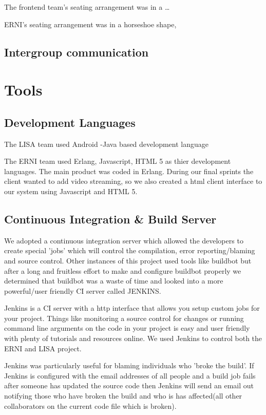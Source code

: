 \documentclass[11pt]{report}
\begin{document}
The frontend team's seating arrangement was in a \ldots

ERNI's seating arrangement was in a horseshoe shape, 

\subsection{Intergroup communication}
\section{Tools}
\subsection{Development Languages}

The LISA team used Android -Java based development language

The ERNI team used Erlang, Javascript, HTML 5  as thier development languages. The main product was coded in Erlang. During our final sprints the client wanted to add video streaming, so we also created a html client interface to our system using Javascript and HTML 5. 


\subsection{Continuous Integration \& Build Server}

We adopted a continuous integration server which allowed the developers to create special 'jobs' which will control the compilation, error reporting/blaming and source control. Other instances of this project used tools like buildbot but after a long and fruitless effort to make and configure buildbot properly we determined that buildbot was a waste of time and looked into a more powerful/user friendly CI server called JENKINS. 

Jenkins is a CI server with a http interface that allows you setup custom jobs for your project. Things like monitoring a source control for changes or running command line arguments on the code in your project is easy and user friendly with plenty of tutorials and resources online. We used Jenkins to control both the ERNI and LISA project. 

Jenkins was particularly useful for blaming individuals who 'broke the build'. If Jenkins is configured with the email addresses of all people and a build job fails after someone has updated the source code then Jenkins will send an email out notifying those who have broken the build and who is has affected(all other collaborators on the current code file which is broken).
\end{document}
